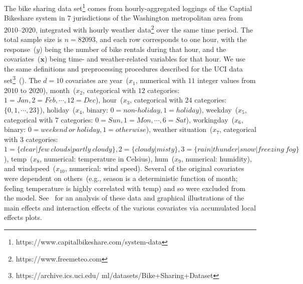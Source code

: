 \documentclass[twoside,11pt]{article}
\begin{document}
The bike sharing data set\footnote{https://www.capitalbikeshare.com/system-data} comes from hourly-aggregated loggings of the Captial Bikeshare system in $7$ jurisdictions of the Washington metropolitan area from $2010$--$2020$, integrated with hourly weather data\footnote{https://www.freemeteo.com} over the same time period. The total sample size is $n=82093$, and each row corresponds to one hour, with the response~($y$) being the number of bike rentals during that hour, and the covariates~($\bm {x}$) being time- and weather-related variables for that hour. We use the same definitions and preprocessing procedures described for the UCI data set\footnote{https://archive.ics.uci.edu/
ml/datasets/Bike+Sharing+Dataset}~(\cite{fanaee2014event}). The $d=10$ covariates are year~($x_1$, numerical with $11$ integer values from $2010$ to $2020$), month~($x_2$, categorical with $12$ categories: $1=Jan, 2=Feb, \cdots, 12=Dec$), hour~($x_3$, categorical with $24$ categories: $\{0,1,\cdots,23\}$), holiday~($x_4$, binary: $0=non\text{-}holiday,1=holiday$), weekday~($x_5$, categorical with $7$ categories: 
$0=Sun,1=Mon,\cdots,6=Sat$), workingday~($x_6$, binary: $0=weekend~or~holiday,1=otherwise$), weather situation~($x_7$, categorical with $3$ categories: $1 = \{clear|few~clouds|partly~cloudy\}, 2=\{cloudy|misty\}, 3=\{rain|thunder|snow|freezing~fog\}$), temp~($x_8$, numerical: temperature in Celsius), hum~($x_{9}$, numerical: humidity), and windspeed~($x_{10}$, numerical: wind speed). Several of the original covariates were dependent on others~(e.g., season is a deterministic function of month; feeling temperature is highly correlated with temp) and so were excluded from the model. See~\cite{apley2020visualizing} for an analysis of these data and graphical illustrations of the main effects and interaction effects of the various covariates via accumulated local effects plots.
\end{document}
